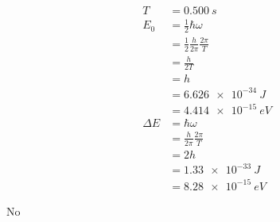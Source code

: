 \documentclass{article}
\begin{document}
\setcounter{subsubsection}{56}
\subsubsection{}

\begin{align*}
  T        & = \qty{0.500}{s}                              \\
  E_0      & = \frac{1}{2} \hbar \omega                    \\
           & = \frac{1}{2} \frac{h}{2 \pi} \frac{2 \pi}{T} \\
           & = \frac{h}{2 T}                               \\
           & = h                                           \\
           & = \qty{6.626e-34}{J}                          \\
           & = \qty{4.414e-15}{eV}                         \\
  \Delta E & = \hbar \omega                                \\
           & = \frac{h}{2 \pi} \frac{2 \pi}{T}             \\
           & = 2 h                                         \\
           & = \qty{1.33e-33}{J}                           \\
           & = \qty{8.28e-15}{eV}
\end{align*}

No

\setcounter{subsubsection}{58}
\subsubsection{}
\end{document}
